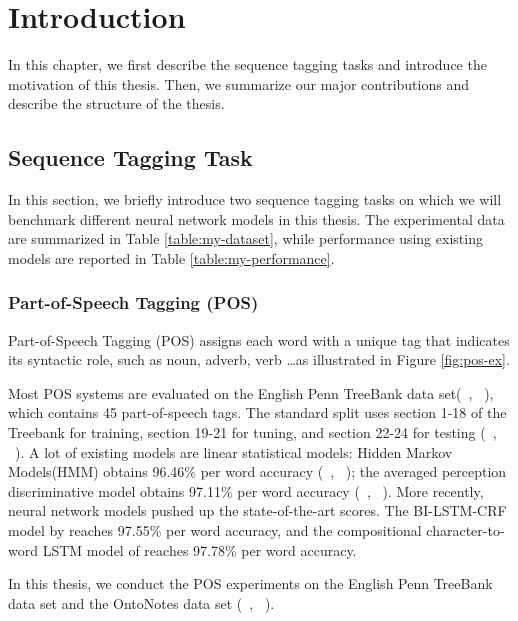 \documentclass{sfuthesis}
\begin{document}
\mainmatter%

\chapter{Introduction}

In this chapter, we first describe the sequence tagging tasks and introduce the motivation of this thesis. Then, we summarize our major contributions and describe the structure of the thesis.

\section{Sequence Tagging Task}

In this section, we briefly introduce two sequence tagging tasks on which we will benchmark different neural network models in this thesis. The experimental data are summarized in Table \ref{table:my-dataset}, while performance using existing models are reported in Table \ref{table:my-performance}.

\subsection{Part-of-Speech Tagging (POS)}
Part-of-Speech Tagging (POS) assigns each word with a unique tag that indicates its syntactic role, such as noun, adverb, verb \dots as illustrated in Figure \ref{fig:pos-ex}. 

Most POS systems are evaluated on the English Penn TreeBank data set(~\citeauthor{marcus1993building}, ~\citeyear{marcus1993building}), which contains 45 part-of-speech tags. The standard split uses section 1-18 of the Treebank for training, section 19-21 for tuning, and section 22-24 for testing (~\citeauthor{toutanova2003feature}, ~\citeyear{toutanova2003feature}). A lot of existing models are linear statistical models: Hidden Markov Models(HMM) obtains 96.46\% per word accuracy (~\citeauthor{mccallum2000maximum}, ~\citeyear{mccallum2000maximum}); the averaged perception discriminative model obtains 97.11\% per word accuracy (~\citeauthor{collins2002discriminative}, ~\citeyear{collins2002discriminative}). More recently, neural network models pushed up the state-of-the-art scores. The BI-LSTM-CRF model by \cite{huang2015bidirectional} reaches 97.55\% per word accuracy, and the compositional character-to-word LSTM model of \cite{ling2015finding} reaches 97.78\% per word accuracy. 

In this thesis, we conduct the POS experiments on the English Penn TreeBank data set and the OntoNotes data set (~\citeauthor{hovy2006ontonotes}, ~\citeyear{hovy2006ontonotes}).
\end{document}
